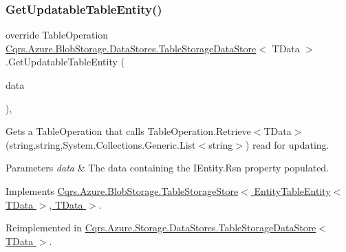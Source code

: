 \subsubsection{\texorpdfstring{Get\+Updatable\+Table\+Entity()}{GetUpdatableTableEntity()}\hspace{0.1cm}{\footnotesize\ttfamily [1/2]}}
{\footnotesize\ttfamily override Table\+Operation \hyperlink{classCqrs_1_1Azure_1_1BlobStorage_1_1DataStores_1_1TableStorageDataStore}{Cqrs.\+Azure.\+Blob\+Storage.\+Data\+Stores.\+Table\+Storage\+Data\+Store}$<$ T\+Data $>$.Get\+Updatable\+Table\+Entity (\begin{DoxyParamCaption}\item[{T\+Data}]{data }\end{DoxyParamCaption})\hspace{0.3cm}{\ttfamily [protected]}, {\ttfamily [virtual]}}



Gets a Table\+Operation that calls Table\+Operation.\+Retrieve$<$\+T\+Data$>$(string,string,\+System.\+Collections.\+Generic.\+List$<$string$>$) read for updating. 


\begin{DoxyParams}{Parameters}
{\em data} & The data containing the I\+Entity.\+Rsn property populated.\\
\hline
\end{DoxyParams}


Implements \hyperlink{classCqrs_1_1Azure_1_1BlobStorage_1_1TableStorageStore_ae476c94b77d9c602aef934bd8c1b20ea_ae476c94b77d9c602aef934bd8c1b20ea}{Cqrs.\+Azure.\+Blob\+Storage.\+Table\+Storage\+Store$<$ Entity\+Table\+Entity$<$ T\+Data $>$, T\+Data $>$}.



Reimplemented in \hyperlink{classCqrs_1_1Azure_1_1Storage_1_1DataStores_1_1TableStorageDataStore_a54f00f53521e285568f19c29527d6466_a54f00f53521e285568f19c29527d6466}{Cqrs.\+Azure.\+Storage.\+Data\+Stores.\+Table\+Storage\+Data\+Store$<$ T\+Data $>$}.

\mbox{\label{classCqrs_1_1Azure_1_1BlobStorage_1_1DataStores_1_1TableStorageDataStore_a2a6af1eed637f7ac828078a883881fd3_a2a6af1eed637f7ac828078a883881fd3}} 
